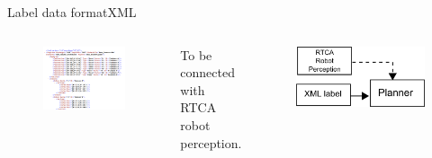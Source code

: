 \begin{frame}{Label data format}{XML}

\begin{columns}
\begin{figure}
\centering
\includegraphics[width = \textwidth]{./screenshot/label_data_xml.png}
\end{figure}

\begin{minipage}{\textwidth}
To be connected with RTCA robot perception.
\begin{figure}
\centering
\includegraphics[width = \textwidth]{./figure/interconnect}
\end{figure}
\end{minipage}
\end{columns}

\end{frame}